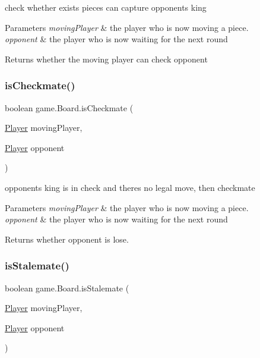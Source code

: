 check whether exists pieces can capture opponent\textquotesingle{}s king 
\begin{DoxyParams}{Parameters}
{\em moving\+Player} & the player who is now moving a piece. \\
\hline
{\em opponent} & the player who is now waiting for the next round \\
\hline
\end{DoxyParams}
\begin{DoxyReturn}{Returns}
whether the moving player can check opponent 
\end{DoxyReturn}
\mbox{\label{classgame_1_1_board_a95871969333ec29f0299b1bbeb277121}} 
\subsubsection{\texorpdfstring{is\+Checkmate()}{isCheckmate()}}
{\footnotesize\ttfamily boolean game.\+Board.\+is\+Checkmate (\begin{DoxyParamCaption}\item[{\mbox{\hyperlink{classgame_1_1_player}{Player}}}]{moving\+Player,  }\item[{\mbox{\hyperlink{classgame_1_1_player}{Player}}}]{opponent }\end{DoxyParamCaption})\hspace{0.3cm}{\ttfamily [inline]}}

opponent\textquotesingle{}s king is in check and there\textquotesingle{}s no legal move, then checkmate 
\begin{DoxyParams}{Parameters}
{\em moving\+Player} & the player who is now moving a piece. \\
\hline
{\em opponent} & the player who is now waiting for the next round \\
\hline
\end{DoxyParams}
\begin{DoxyReturn}{Returns}
whether opponent is lose. 
\end{DoxyReturn}
\mbox{\label{classgame_1_1_board_a7f5f2366e087babfd08a82afc332771c}} 
\subsubsection{\texorpdfstring{is\+Stalemate()}{isStalemate()}}
{\footnotesize\ttfamily boolean game.\+Board.\+is\+Stalemate (\begin{DoxyParamCaption}\item[{\mbox{\hyperlink{classgame_1_1_player}{Player}}}]{moving\+Player,  }\item[{\mbox{\hyperlink{classgame_1_1_player}{Player}}}]{opponent }\end{DoxyParamCaption})\hspace{0.3cm}{\ttfamily [inline]}}

